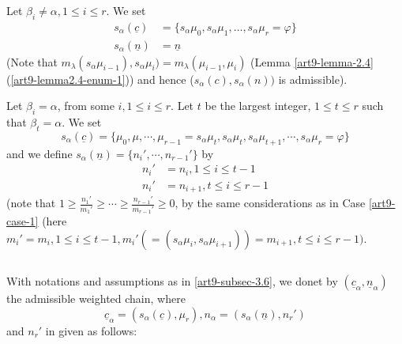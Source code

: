 \begin{case}\label{art9-subsec3.6-case-1}
Let $\beta_{i}\neq \alpha, 1 \leq i \leq r$. We set
\begin{align*}
s_{\alpha}(\underline{c}) &= \{s_{\alpha}\mu_{0}, s_{\alpha}\mu_{1}, \ldots, s_{\alpha}\mu_{r} = {\varphi}\}\\
s_{\alpha}(\underline{n}) &= \underline{n}
\end{align*}
(Note that $m_{\lambda}(s_{\alpha}\mu_{i-1}), s_{\alpha}\mu_{i}) = m_{\lambda}(\mu_{i-1}, \mu_{i})$
(Lemma \ref{art9-lemma-2.4} (\ref{art9-lemma2.4-enum-1})) and hence ($s_{\alpha}(c), s_{\alpha}(n))$ is admissible). 
\end{case}

\begin{case}\label{art9-subsec3.6-case-2}
Let $\beta_{i}= \alpha$, from some $i, 1\leq i \leq r$. Let $t$ be the largest integer, $1 \leq t \leq r$ such that $\beta_{t} = \alpha$. We set
$$
s_{\alpha}(\underline{c}) = \{ \mu_{0}, \mu, \cdots, \mu_{r-1} = s_{\alpha}\mu_{t}, s_{\alpha}\mu_{t}, s_{\alpha}\mu_{t+1}, \cdots, s_{\alpha}\mu_{r} = \varphi\}
$$
and we define $s_{\alpha}(\underline{n}) = \{n_{i}', \cdots, n_{r-1}'\}$ by
\begin{align*}
n_{i}' &= n_{i}, 1\leq i \leq t-1\\
n_{i}' &= n_{i+1}, t\leq i\leq r-1
\end{align*}
(note that $1 \geq \frac{n_{1}'}{m_{1}'} \geq \cdots \geq \frac{n_{r-1}'}{m_{r-1}'} \geq 0$, by the same considerations as in Case \ref{art9-case-1} (here $m_{i}' =m_{i}, 1 \leq i \leq t-1, m_{i}'(=(s_{\alpha}\mu_{i}, s_{\alpha}\mu_{i+1}))=m_{i+1}, t \leq i \leq r-1)$.
\end{case}

\subsection{}\label{art9-subsec-3.7}
With notations and assumptions as in \ref{art9-subsec-3.6}, we donet by $(\underline{c}_{\alpha}, \underline{n}_{\alpha})$ the admissible weighted chain, where
$$
\underline{c}_{\alpha} = (s_{\alpha}(\underline{c}), \mu_{r}), n_{\alpha} = (s_{\alpha}(\underline{n}), n_{r}')
$$
and $n_{r}'$ in given as follows:

